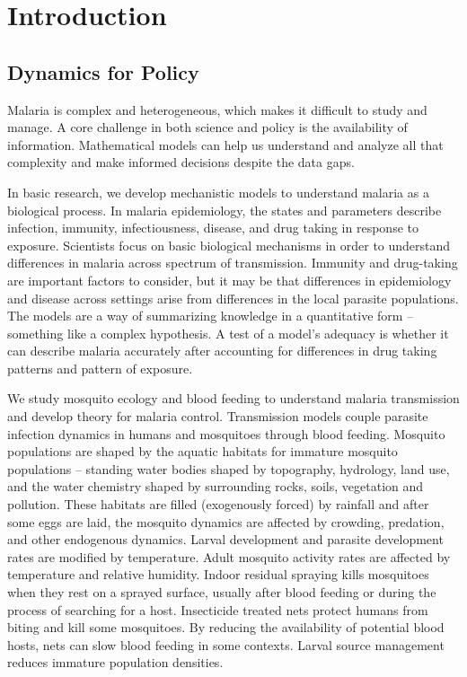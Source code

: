 \documentclass[
]{book}
\begin{document}
\hypertarget{part-introduction}{%
\part{Introduction}\label{part-introduction}}

\hypertarget{dynamics-for-policy}{%
\chapter{Dynamics for Policy}\label{dynamics-for-policy}}

Malaria is complex and heterogeneous, which makes it difficult to study and manage. A core challenge in both science and policy is the availability of information. Mathematical models can help us understand and analyze all that complexity and make informed decisions despite the data gaps.

In basic research, we develop mechanistic models to understand malaria as a biological process. In malaria epidemiology, the states and parameters describe infection, immunity, infectiousness, disease, and drug taking in response to exposure. Scientists focus on basic biological mechanisms in order to understand differences in malaria across spectrum of transmission. Immunity and drug-taking are important factors to consider, but it may be that differences in epidemiology and disease across settings arise from differences in the local parasite populations. The models are a way of summarizing knowledge in a quantitative form -- something like a complex hypothesis. A test of a model's adequacy is whether it can describe malaria accurately after accounting for differences in drug taking patterns and pattern of exposure.

We study mosquito ecology and blood feeding to understand malaria transmission and develop theory for malaria control. Transmission models couple parasite infection dynamics in humans and mosquitoes through blood feeding. Mosquito populations are shaped by the aquatic habitats for immature mosquito populations -- standing water bodies shaped by topography, hydrology, land use, and the water chemistry shaped by surrounding rocks, soils, vegetation and pollution. These habitats are filled (exogenously forced) by rainfall and after some eggs are laid, the mosquito dynamics are affected by crowding, predation, and other endogenous dynamics. Larval development and parasite development rates are modified by temperature. Adult mosquito activity rates are affected by temperature and relative humidity. Indoor residual spraying kills mosquitoes when they rest on a sprayed surface, usually after blood feeding or during the process of searching for a host. Insecticide treated nets protect humans from biting and kill some mosquitoes. By reducing the availability of potential blood hosts, nets can slow blood feeding in some contexts. Larval source management reduces immature population densities.
\end{document}
